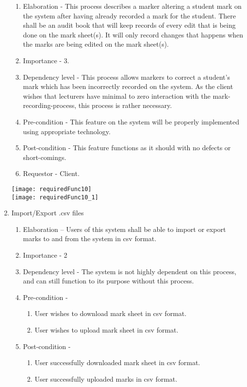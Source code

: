 \documentclass[12pt, a4paper]{scrartcl}
\begin{document}
\begin{enumerate}
\begin{enumerate}
						\item Elaboration - This process describes a marker altering a student mark on the system after having already recorded a mark for the student. There shall be an audit book that will keep records of every edit that is being done on the mark sheet(s). It will only record changes that happens when the marks are being edited on the mark sheet(s).
						\item Importance - 3.
						\item Dependency level - This process allows markers to correct a student’s mark which has been incorrectly recorded on the system. As the client wishes that lecturers have minimal to zero interaction with the mark-recording-process, this process is rather necessary.
						\item Pre-condition - This feature on the system will be properly implemented using appropriate technology.
						\item Post-condition - This feature functions as it should with no defects or short-comings.
						\item Requestor - Client.
					\end{enumerate}
					\texttt{[image: requiredFunc10]}\\
					\texttt{[image: requiredFunc10\_1]}
					\item Import/Export .csv files
					\begin{enumerate}
						\item Elaboration – Users of this system shall be able to import or export marks to and from the system in csv format.
						\item Importance - 2
						\item Dependency level - The system is not highly dependent on this process, and can still function to its purpose without this process.
						\item Pre-condition - 
						\begin{enumerate}
							\item User wishes to download mark sheet in csv format.
							\item User wishes to upload mark sheet in csv format.
						\end{enumerate}
						\item Post-condition -
						\begin{enumerate}
							\item User successfully downloaded mark sheet in csv format.
							\item User successfully uploaded marks in csv format.

\end{enumerate}
\end{enumerate}
\end{enumerate}
\end{document}
